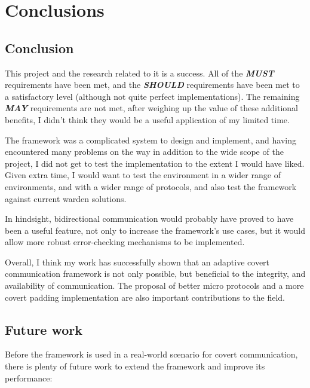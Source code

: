 \chapter{Conclusions}
\section{Conclusion}

This project and the research related to it is a success. All of the \textbf{\textit{MUST}} requirements have been met, and the \textbf{\textit{SHOULD}} requirements have been met to a satisfactory level (although not quite perfect implementations). The remaining \textbf{\textit{MAY}} requirements are not met, after weighing up the value of these additional benefits, I didn't think they would be a useful application of my limited time.

The framework was a complicated system to design and implement, and having encountered many problems on the way in addition to the wide scope of the project, I did not get to test the implementation to the extent I would have liked. Given extra time, I would want to test the environment in a wider range of environments, and with a wider range of protocols, and also test the framework against current warden solutions.

In hindsight, bidirectional communication would probably have proved to have been a useful feature, not only to increase the framework's use cases, but it would allow more robust error-checking mechanisms to be implemented.

Overall, I think my work has successfully shown that an adaptive covert communication framework is not only possible, but beneficial to the integrity, and availability of communication. The proposal of better micro protocols and a more covert padding implementation are also important contributions to the field.

\section{Future work}

Before the framework is used in a real-world scenario for covert communication, there is plenty of future work to extend the framework and improve its performance:

